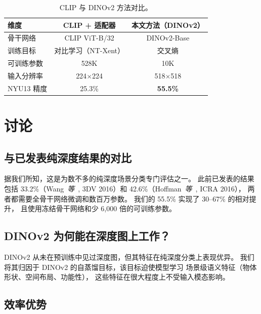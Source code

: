\documentclass[conference, a4paper]{IEEEtran}
\begin{document}
\begin{table}[htb]
    \centering
    \caption{CLIP 与 DINOv2 方法对比。}
    \label{tab:comparison}
    \footnotesize
    \begin{tabular}{lcc}
        \toprule
        \textbf{维度} & \textbf{CLIP + 适配器} & \textbf{本文方法（DINOv2）} \\
        \midrule
        骨干网络 & CLIP ViT-B/32 & DINOv2-Base \\
        训练目标 & 对比学习（NT-Xent） & 交叉熵 \\
        可训练参数 & 528K & 10K \\
        输入分辨率 & 224$\times$224 & 518$\times$518 \\
        NYU13 精度 & 25.3\% & \textbf{55.5\%} \\
        \bottomrule
    \end{tabular}
\end{table}

\section{讨论}

\subsection{与已发表纯深度结果的对比}

据我们所知，这是为数不多的纯深度场景分类专门评估之一。
此前已发表的结果包括
33.2\%（Wang~\textit{等}~\cite{wang3d}, 3DV 2016）和
42.6\%（Hoffman~\textit{等}~\cite{hoffman2016}, ICRA 2016），
两者都需要全骨干网络微调和数百万参数。
我们的 55.5\% 实现了 30--67\% 的相对提升，
且使用冻结骨干网络和少 6,000 倍的可训练参数。

\subsection{DINOv2 为何能在深度图上工作？}

DINOv2 从未在预训练中见过深度图，但其特征在纯深度分类上表现优异。
我们将其归因于 DINOv2 的自蒸馏目标，该目标迫使模型学习
场景级语义特征（物体形状、空间布局、功能性），
这些特征在很大程度上不受输入模态影响。

\subsection{效率优势}
\end{document}
